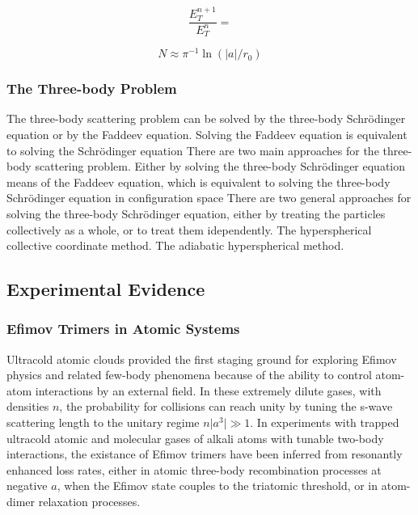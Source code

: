 \documentclass{article}
\providecommand{\abs}[1]{\lvert#1\rvert} \providecommand{\norm}[1]{\lVert#1\rVert}
\begin{document}
\begin{equation}
\frac{E_T^{n+1}}{E_T^{n}} = 
\end{equation}

\begin{equation}
N \approx \pi^{-1} \ln(\abs{a}/r_0)
\end{equation}

\subsubsection{The Three-body Problem}
The three-body scattering problem can be solved by the three-body Schr{\"o}dinger equation or by the Faddeev equation. Solving the Faddeev equation is equivalent to solving the Schr{\"o}dinger equation 
There are two main approaches for the three-body scattering problem. Either by solving the three-body Schr{\"o}dinger equation means of the Faddeev equation, which is equivalent to solving the three-body Schr{\"o}dinger equation in configuration space   
There are two general approaches for solving the three-body Schr{\"o}dinger equation, either by treating the particles collectively as a whole, or to treat them idependently. The hyperspherical collective coordinate method. The adiabatic hyperspherical method.

\subsection{Experimental Evidence}
\subsubsection{Efimov Trimers in Atomic Systems}
Ultracold atomic clouds provided the first staging ground for exploring Efimov physics and related few-body phenomena because of the ability to control atom-atom interactions by an external field. In these extremely dilute gases, with densities $n$, the probability for collisions can reach unity by tuning the s-wave scattering length to the unitary regime $n\abs{a^3}\gg1$. In experiments with trapped ultracold atomic and molecular gases of alkali atoms with tunable two-body interactions, the existance of Efimov trimers have been inferred from resonantly enhanced loss rates, either in atomic three-body recombination processes at negative $a$, when the Efimov state couples to the triatomic threshold, or in atom-dimer relaxation processes. 
\end{document}
